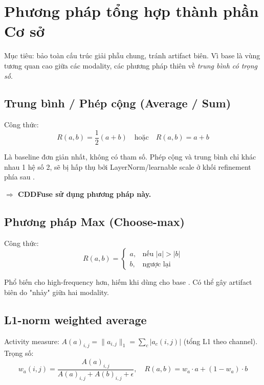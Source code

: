\documentclass[12pt,a4paper]{article}
\begin{document}
\section{Phương pháp tổng hợp thành phần Cơ sở}
\label{sec:base-fusion}

Mục tiêu: bảo toàn cấu trúc giải phẫu chung, tránh artifact biên. Vì base là vùng tương quan cao giữa các modality, các phương pháp thiên về \emph{trung bình có trọng số}.

\subsection{Trung bình / Phép cộng (Average / Sum)}

Công thức:
\begin{equation}
R(a, b) = \frac{1}{2}(a + b) \quad \text{hoặc} \quad R(a, b) = a + b
\end{equation}

Là baseline đơn giản nhất, không có tham số. Phép cộng và trung bình chỉ khác nhau 1 hệ số 2, sẽ bị hấp thụ bởi LayerNorm/learnable scale ở khối refinement phía sau \cite{burt1983laplacian}.

\textbf{$\Rightarrow$ CDDFuse \cite{zhao2023cddfuse} sử dụng phương pháp này.}

\subsection{Phương pháp Max (Choose-max)}

Công thức:
\begin{equation}
R(a, b) = \begin{cases} a, & \text{nếu } |a| > |b| \\ b, & \text{ngược lại} \end{cases}
\end{equation}

Phổ biến cho high-frequency hơn, hiếm khi dùng cho base \cite{li1995wavelet}. Có thể gây artifact biên do "nhảy" giữa hai modality.

\subsection{L1-norm weighted average}

Activity measure: $A(a)_{i,j} = \|a_{i,j}\|_1 = \sum_c |a_c(i,j)|$ (tổng L1 theo channel). Trọng số:
\begin{equation}
w_a(i,j) = \frac{A(a)_{i,j}}{A(a)_{i,j} + A(b)_{i,j} + \epsilon}, \quad
R(a, b) = w_a \cdot a + (1 - w_a) \cdot b
\end{equation}
\end{document}
